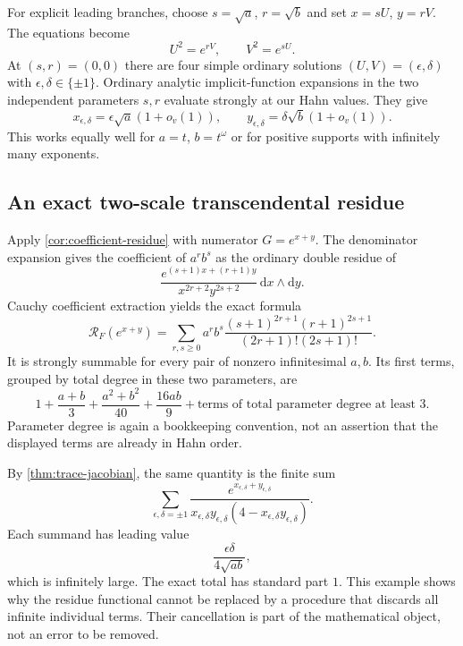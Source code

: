 \documentclass[11pt,letterpaper]{article}
\theoremstyle{definition}
\theoremstyle{remark}
\newcommand{\RF}{\mathcal R_F}
\newcommand{\dif}{\mathrm d}
\numberwithin{equation}{section}
\begin{document}
For explicit leading branches, choose $s=\sqrt a$, $r=\sqrt b$ and set $x=sU$, $y=rV$. The equations become
\[
 U^2=e^{rV},\qquad V^2=e^{sU}.
\]
At $(s,r)=(0,0)$ there are four simple ordinary solutions $(U,V)=(\epsilon,\delta)$ with $\epsilon,\delta\in\{\pm1\}$. Ordinary analytic implicit-function expansions in the two independent parameters $s,r$ evaluate strongly at our Hahn values. They give
\begin{equation}\label{eq:trans-leading}
 x_{\epsilon,\delta}=\epsilon\sqrt a(1+o_v(1)),
 \qquad
 y_{\epsilon,\delta}=\delta\sqrt b(1+o_v(1)).
\end{equation}
This works equally well for $a=t$, $b=t^\omega$ or for positive supports with infinitely many exponents.

\subsection{An exact two-scale transcendental residue}
Apply \cref{cor:coefficient-residue} with numerator $G=e^{x+y}$. The denominator expansion gives the coefficient of $a^r b^s$ as the ordinary double residue of
\[
 \frac{e^{(s+1)x+(r+1)y}}{x^{2r+2}y^{2s+2}}\,\dif x\wedge\dif y.
\]
Cauchy coefficient extraction yields the exact formula
\begin{equation}\label{eq:trans-residue}
 \boxed{\displaystyle
 \RF(e^{x+y})=
 \sum_{r,s\ge0}a^r b^s
 \frac{(s+1)^{2r+1}(r+1)^{2s+1}}
 {(2r+1)!(2s+1)!}.}
\end{equation}
It is strongly summable for every pair of nonzero infinitesimal $a,b$. Its first terms, grouped by total degree in these two parameters, are
\begin{equation}\label{eq:trans-residue-first}
 1+\frac{a+b}{3}+\frac{a^2+b^2}{40}+\frac{16ab}{9}
 +\text{terms of total parameter degree at least }3.
\end{equation}
Parameter degree is again a bookkeeping convention, not an assertion that the displayed terms are already in Hahn order.

By \cref{thm:trace-jacobian}, the same quantity is the finite sum
\begin{equation}\label{eq:trans-root-sum}
 \sum_{\epsilon,\delta=\pm1}
 \frac{e^{x_{\epsilon,\delta}+y_{\epsilon,\delta}}}
 {x_{\epsilon,\delta}y_{\epsilon,\delta}
  (4-x_{\epsilon,\delta}y_{\epsilon,\delta})}.
\end{equation}
Each summand has leading value
\[
 \frac{\epsilon\delta}{4\sqrt{ab}},
\]
which is infinitely large. The exact total has standard part $1$. This example shows why the residue functional cannot be replaced by a procedure that discards all infinite individual terms. Their cancellation is part of the mathematical object, not an error to be removed.
\end{document}
